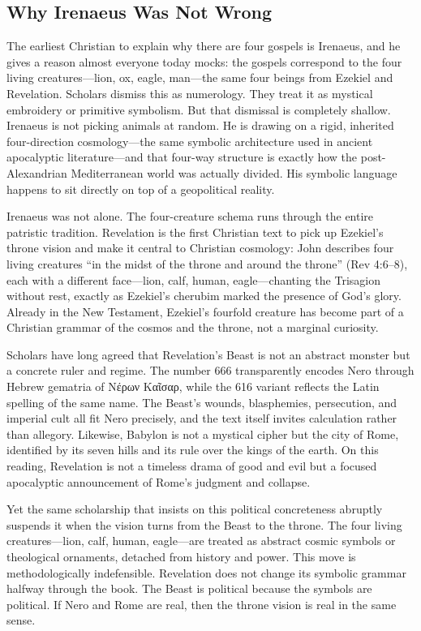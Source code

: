 \subsection{Why Irenaeus Was Not Wrong}

The earliest Christian to explain why there are four gospels is Irenaeus, and he gives a reason almost everyone today mocks: the gospels correspond to the four living creatures---lion, ox, eagle, man---the same four beings from Ezekiel and Revelation.
Scholars dismiss this as numerology.
They treat it as mystical embroidery or primitive symbolism.
But that dismissal is completely shallow.
Irenaeus is not picking animals at random.
He is drawing on a rigid, inherited four-direction cosmology---the same symbolic architecture used in ancient apocalyptic literature---and that four-way structure is exactly how the post-Alexandrian Mediterranean world was actually divided.
His symbolic language happens to sit directly on top of a geopolitical reality.

Irenaeus was not alone.
The four-creature schema runs through the entire patristic tradition.
Revelation is the first Christian text to pick up Ezekiel's throne vision and make it central to Christian cosmology: John describes four living creatures ``in the midst of the throne and around the throne'' (Rev 4:6--8), each with a different face---lion, calf, human, eagle---chanting the Trisagion without rest, exactly as Ezekiel's cherubim marked the presence of God's glory.
Already in the New Testament, Ezekiel's fourfold creature has become part of a Christian grammar of the cosmos and the throne, not a marginal curiosity.

Scholars have long agreed that Revelation's Beast is not an abstract monster but a concrete ruler and regime.
The number 666 transparently encodes Nero through Hebrew gematria of Νέρων Καῖσαρ, while the 616 variant reflects the Latin spelling of the same name.
The Beast's wounds, blasphemies, persecution, and imperial cult all fit Nero precisely, and the text itself invites calculation rather than allegory.
Likewise, Babylon is not a mystical cipher but the city of Rome, identified by its seven hills and its rule over the kings of the earth.
On this reading, Revelation is not a timeless drama of good and evil but a focused apocalyptic announcement of Rome's judgment and collapse.

Yet the same scholarship that insists on this political concreteness abruptly suspends it when the vision turns from the Beast to the throne.
The four living creatures---lion, calf, human, eagle---are treated as abstract cosmic symbols or theological ornaments, detached from history and power.
This move is methodologically indefensible.
Revelation does not change its symbolic grammar halfway through the book.
The Beast is political because the symbols are political.
If Nero and Rome are real, then the throne vision is real in the same sense.

